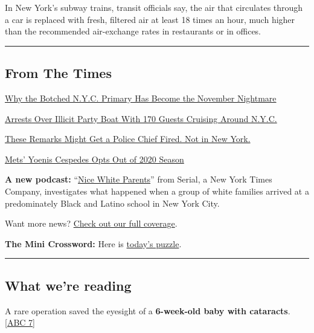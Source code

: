 In New York's subway trains, transit officials say, the air that
circulates through a car is replaced with fresh, filtered air at least
18 times an hour, much higher than the recommended air-exchange rates in
restaurants or in offices.

\begin{center}\rule{0.5\linewidth}{\linethickness}\end{center}

\hypertarget{from-the-times}{%
\subsection{From The Times}\label{from-the-times}}

\href{https://www.nytimes.com/2020/08/03/nyregion/nyc-mail-ballots-voting.html}{Why
the Botched N.Y.C. Primary Has Become the November Nightmare}

\href{https://www.nytimes.com/2020/08/02/nyregion/liberty-belle-illegal-party.html}{Arrests
Over Illicit Party Boat With 170 Guests Cruising Around N.Y.C.}

\href{https://www.nytimes.com/2020/08/03/nyregion/police-shea-de-blasio-nyc.html}{These
Remarks Might Get a Police Chief Fired. Not in New York.}

\href{https://www.nytimes.com/2020/08/02/sports/baseball/Yoenis-cespedes-opt-out-rule.html}{Mets'
Yoenis Cespedes Opts Out of 2020 Season}

\textbf{A new podcast:}
``\href{https://www.nytimes.com/2020/07/30/podcasts/nice-white-parents-serial.html}{Nice
White Parents}'' from Serial, a New York Times Company, investigates
what happened when a group of white families arrived at a predominately
Black and Latino school in New York City.

Want more news? \href{https://www.nytimes.com/section/nyregion}{Check
out our full coverage}.

\textbf{The Mini Crossword:} Here is
\href{https://www.nytimes.com/crosswords/game/mini}{today's puzzle}.

\begin{center}\rule{0.5\linewidth}{\linethickness}\end{center}

\hypertarget{what-were-reading}{%
\subsection{What we're reading}\label{what-were-reading}}

A rare operation saved the eyesight of a \textbf{6-week-old baby with
cataracts}. {[}\href{https://abc7ny.com/6340873/}{ABC 7}{]}

